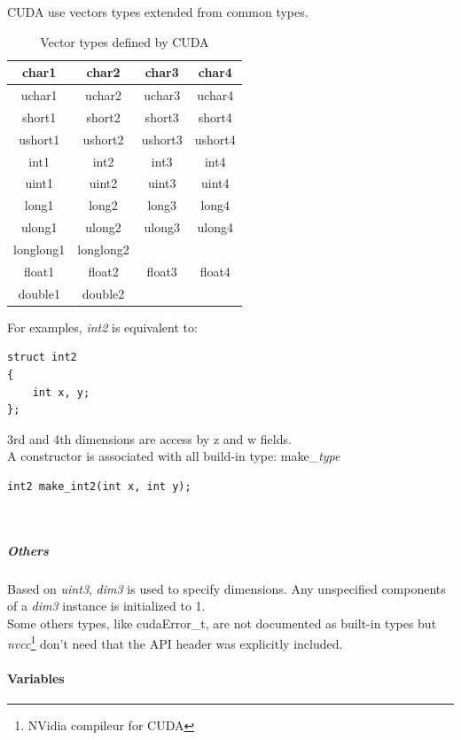 CUDA use vectors types extended from common types.
\begin{table}[!h]
	\caption{Vector types defined by CUDA}
	\center
	\begin{tabular}{|c|c|c|c|} \hline
	char1 & char2 & char3 & char4 \\\hline
	uchar1 & uchar2 & uchar3 & uchar4 \\\hline
	short1 & short2 & short3 & short4 \\\hline
	ushort1 & ushort2 & ushort3 & ushort4 \\\hline
	int1 & int2 & int3 & int4 \\\hline
	uint1 & uint2 & uint3 & uint4 \\\hline
	long1 & long2 & long3 & long4 \\\hline
	ulong1 & ulong2 & ulong3 & ulong4 \\\hline
	longlong1 & longlong2 &  & \\\hline
	float1 & float2 & float3 & float4 \\\hline
	double1 & double2 &  & \\\hline
	\end{tabular}
	\label{heterogeneous:tabCudaVector}
\end{table}

For examples, \emph{int2} is equivalent to:
\begin{verbatim}struct int2
{
	int x, y;
};\end{verbatim}
3rd and 4th dimensions are access by z and w fields.\\

A constructor is associated with all build-in type: make\_\emph{type}
\begin{verbatim}int2 make_int2(int x, int y);\end{verbatim}\\
			
					\subparagraph{Others}

Based on \emph{uint3}, \emph{dim3} is used to specify dimensions. Any unspecified components of a \emph{dim3} instance is initialized to 1.\\

Some others types, like cudaError\_t, are not documented as built-in types but \emph{nvcc}\footnote{NVidia compileur for CUDA} don't need that the 
API header was explicitly included.

				\paragraph{Variables}

